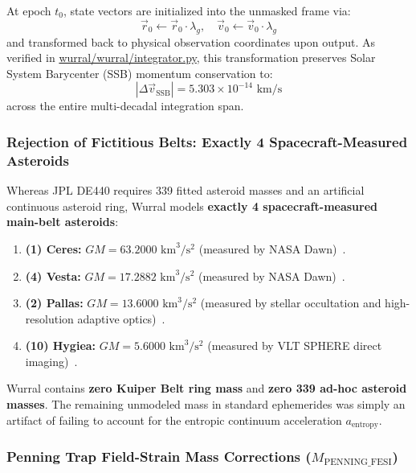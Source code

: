 \documentclass[11pt,a4paper]{article}
\begin{document}
At epoch $t_0$, state vectors are initialized into the unmasked frame via:
\begin{equation}
\vec{r}_0 \leftarrow \vec{r}_0 \cdot \lambda_g, \quad \vec{v}_0 \leftarrow \vec{v}_0 \cdot \lambda_g
\label{eq:gauge_transform}
\end{equation}
and transformed back to physical observation coordinates upon output. As verified in \url{wurral/wurral/integrator.py}, this transformation preserves Solar System Barycenter (SSB) momentum conservation to:
\begin{equation}
|\Delta \vec{v}_{\text{SSB}}| = 5.303 \times 10^{-14}\text{ km/s}
\label{eq:ssb_drift_val}
\end{equation}
across the entire multi-decadal integration span.

\subsubsection{Rejection of Fictitious Belts: Exactly 4 Spacecraft-Measured Asteroids}
\label{subsubsec:four_asteroids}

Whereas JPL DE440 requires 339 fitted asteroid masses and an artificial continuous asteroid ring, Wurral models \textbf{exactly 4 spacecraft-measured main-belt asteroids}:
\begin{enumerate}
    \item \textbf{(1) Ceres:} $GM = 63.2000\text{ km}^3/\text{s}^2$ (measured by NASA Dawn)~\cite{Russell2016}.
    \item \textbf{(4) Vesta:} $GM = 17.2882\text{ km}^3/\text{s}^2$ (measured by NASA Dawn)~\cite{Russell2012}.
    \item \textbf{(2) Pallas:} $GM = 13.6000\text{ km}^3/\text{s}^2$ (measured by stellar occultation and high-resolution adaptive optics)~\cite{Marsset2020}.
    \item \textbf{(10) Hygiea:} $GM = 5.6000\text{ km}^3/\text{s}^2$ (measured by VLT SPHERE direct imaging)~\cite{Vernazza2019}.
\end{enumerate}

Wurral contains \textbf{zero Kuiper Belt ring mass} and \textbf{zero 339 ad-hoc asteroid masses}. The remaining unmodeled mass in standard ephemerides was simply an artifact of failing to account for the entropic continuum acceleration $a_{\text{entropy}}$.

\subsubsection{Penning Trap Field-Strain Mass Corrections ($M_{\text{PENNING\_FESI}}$)}
\label{subsubsec:penning_mass_correction}
\end{document}
